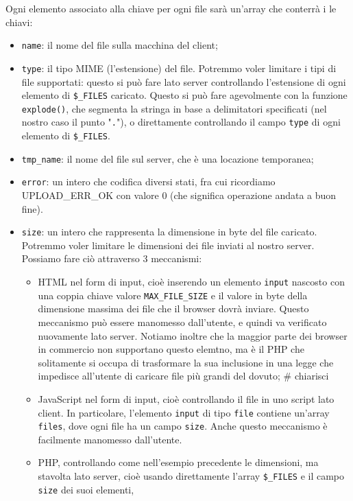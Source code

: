 \documentclass[a4paper,11pt]{article}
\begin{document}
Ogni elemento associato alla chiave per ogni file sarà un'array che conterrà i le chiavi:
\begin{itemize}
	\item \lstinline|name|: il nome del file sulla macchina del client;
	\item \lstinline|type|: il tipo MIME (l'estensione) del file.
		Potremmo voler limitare i tipi di file supportati: questo si può fare lato server controllando l'estensione di ogni elemento di \lstinline|$_FILES| caricato.
		Questo si può fare agevolmente con la funzione \lstinline|explode()|, che segmenta la stringa in base a delimitatori specificati (nel nostro caso il punto "\lstinline|.|"), o direttamente controllando il campo \lstinline|type| di ogni elemento di \lstinline|$_FILES|.
	\item \lstinline|tmp_name|: il nome del file sul server, che è una locazione temporanea;
	\item \lstinline|error|: un intero che codifica diversi stati, fra cui ricordiamo UPLOAD\_ERR\_OK con valore 0 (che significa operazione andata a buon fine).
	\item \lstinline|size|: un intero che rappresenta la dimensione in byte del file caricato. Potremmo voler limitare le dimensioni dei file inviati al nostro server. Possiamo fare ciò attraverso 3 meccanismi:
		\begin{itemize}
			\item HTML nel form di input, cioè inserendo un elemento \lstinline|input| nascosto con una coppia chiave valore \lstinline|MAX_FILE_SIZE| e il valore in byte della dimensione massima dei file che il browser dovrà inviare.
				Questo meccanismo può essere manomesso dall'utente, e quindi va verificato nuovamente lato server.
				Notiamo inoltre che la maggior parte dei browser in commercio non supportano questo elemtno, ma è il PHP che solitamente si occupa di trasformare la sua inclusione in una legge che impedisce all'utente di caricare file più grandi del dovuto; # chiarisci
			\item JavaScript nel form di input, cioè controllando il file in uno script lato client. In particolare, l'elemento \lstinline|input| di tipo \lstinline|file| contiene un'array \lstinline|files|, dove ogni file ha un campo \lstinline|size|.
				Anche questo meccanismo è facilmente manomesso dall'utente.
			\item PHP,  controllando come nell'esempio precedente le dimensioni, ma stavolta lato server, cioè usando direttamente l'array \lstinline|$_FILES| e il campo \lstinline|size| dei suoi elementi, 
		\end{itemize}
\end{itemize}
\end{document}

